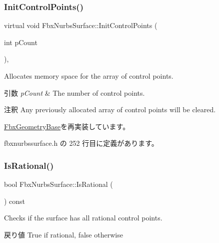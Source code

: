 \subsubsection{\texorpdfstring{Init\+Control\+Points()}{InitControlPoints()}\hspace{0.1cm}{\footnotesize\ttfamily [2/2]}}
{\footnotesize\ttfamily virtual void Fbx\+Nurbs\+Surface\+::\+Init\+Control\+Points (\begin{DoxyParamCaption}\item[{int}]{p\+Count }\end{DoxyParamCaption})\hspace{0.3cm}{\ttfamily [inline]}, {\ttfamily [virtual]}}

Allocates memory space for the array of control points. 
\begin{DoxyParams}{引数}
{\em p\+Count} & The number of control points. \\
\hline
\end{DoxyParams}
\begin{DoxyRemark}{注釈}
Any previously allocated array of control points will be cleared. 
\end{DoxyRemark}


\hyperlink{class_fbx_geometry_base_a471b736f2595c006a338c07a61907127}{Fbx\+Geometry\+Base}を再実装しています。



 fbxnurbssurface.\+h の 252 行目に定義があります。

\mbox{\label{class_fbx_nurbs_surface_a63da464e4d5624d7615c69047a922fca}} 
\subsubsection{\texorpdfstring{Is\+Rational()}{IsRational()}}
{\footnotesize\ttfamily bool Fbx\+Nurbs\+Surface\+::\+Is\+Rational (\begin{DoxyParamCaption}{ }\end{DoxyParamCaption}) const}

Checks if the surface has all rational control points. \begin{DoxyReturn}{戻り値}
{\ttfamily True} if rational, {\ttfamily false} otherwise 
\end{DoxyReturn}
\mbox{\label{class_fbx_nurbs_surface_a1187437512afcb9a2ea309255e4bee82}} 
